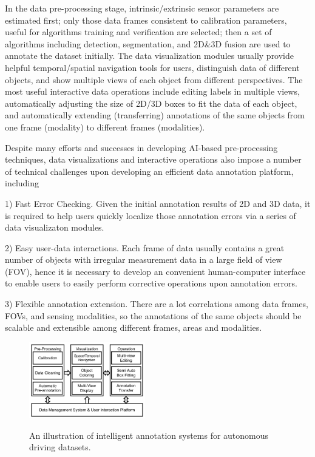 \documentclass[letterpaper, 10 pt, conference]{ieeeconf}  %
\begin{document}
In the data pre-processing stage, intrinsic/extrinsic sensor parameters are estimated first; only those data frames consistent to calibration parameters, useful for algorithms training and verification are selected; then a set of algorithms including detection, segmentation, and 2D\&3D fusion are used to annotate the dataset initially. The data visualization modules usually provide helpful temporal/spatial navigation tools for users, distinguish data of different objects, and show multiple views of each object from different perspectives. The most useful interactive data operations include editing labels in multiple views, automatically adjusting the size of 2D/3D boxes to fit the data of each object, and automatically extending (transferring) annotations of the same objects from one frame (modality) to different frames (modalities).


Despite many efforts and successes in developing AI-based pre-processing techniques, data visualizations and interactive operations also impose a number of technical challenges upon developing an efficient data annotation platform, including

1) Fast Error Checking.  Given the initial annotation results of 2D and 3D data, it is required to help users quickly localize those annotation errors via a series of data visualizaton modules.

2) Easy user-data interactions. Each frame of data usually contains a great number of objects with irregular measurement data in a large field of view (FOV), hence it is necessary to develop an convenient human-computer interface to enable users to easily perform corrective operations upon annotation errors.

3) Flexible annotation extension. There are a lot correlations among data frames, FOVs, and sensing modalities, so the annotations of the same objects should be scalable and extensible among different frames, areas and modalities.


\begin{figure}[tp]
	\centering
	\includegraphics[width=0.45\textwidth]{./platform}\\ %
	\caption{An illustration of intelligent annotation systems for autonomous driving datasets.}
	\label{fig:main-arch}
	\vspace{-0.3cm}
\end{figure}
\end{document}
